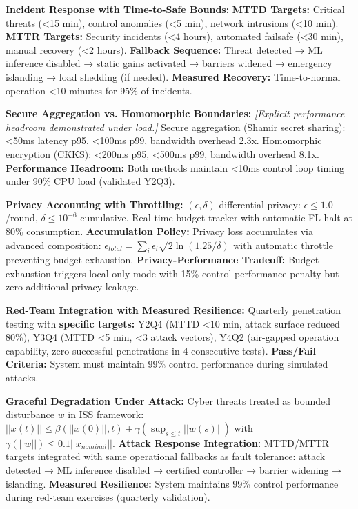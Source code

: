 \documentclass[12pt]{article}
\begin{document}
\textbf{Incident Response with Time-to-Safe Bounds:} \textbf{MTTD Targets:} Critical threats (<15 min), control anomalies (<5 min), network intrusions (<10 min). \textbf{MTTR Targets:} Security incidents (<4 hours), automated failsafe (<30 min), manual recovery (<2 hours). \textbf{Fallback Sequence:} Threat detected → ML inference disabled → static gains activated → barriers widened → emergency islanding → load shedding (if needed). \textbf{Measured Recovery:} Time-to-normal operation <10 minutes for 95\% of incidents.

\textbf{Secure Aggregation vs. Homomorphic Boundaries:} \textit{[Explicit performance headroom demonstrated under load.]} Secure aggregation (Shamir secret sharing): <50ms latency p95, <100ms p99, bandwidth overhead 2.3x. Homomorphic encryption (CKKS): <200ms p95, <500ms p99, bandwidth overhead 8.1x. \textbf{Performance Headroom:} Both methods maintain <10ms control loop timing under 90\% CPU load (validated Y2Q3).

\textbf{Privacy Accounting with Throttling:} $(\epsilon, \delta)$-differential privacy: $\epsilon \leq 1.0$/round, $\delta \leq 10^{-6}$ cumulative. Real-time budget tracker with automatic FL halt at 80\% consumption. \textbf{Accumulation Policy:} Privacy loss accumulates via advanced composition: $\epsilon_{total} = \sum_i \epsilon_i \sqrt{2\ln(1.25/\delta)}$ with automatic throttle preventing budget exhaustion. \textbf{Privacy-Performance Tradeoff:} Budget exhaustion triggers local-only mode with 15\% control performance penalty but zero additional privacy leakage.

\textbf{Red-Team Integration with Measured Resilience:} Quarterly penetration testing with \textbf{specific targets:} Y2Q4 (MTTD <10 min, attack surface reduced 80\%), Y3Q4 (MTTD <5 min, <3 attack vectors), Y4Q2 (air-gapped operation capability, zero successful penetrations in 4 consecutive tests). \textbf{Pass/Fail Criteria:} System must maintain 99\% control performance during simulated attacks.

\textbf{Graceful Degradation Under Attack:} Cyber threats treated as bounded disturbance $w$ in ISS framework: $||x(t)|| \leq \beta(||x(0)||, t) + \gamma(\sup_{s \leq t} ||w(s)||)$ with $\gamma(||w||) \leq 0.1||x_{nominal}||$. \textbf{Attack Response Integration:} MTTD/MTTR targets integrated with same operational fallbacks as fault tolerance: attack detected → ML inference disabled → certified controller → barrier widening → islanding. \textbf{Measured Resilience:} System maintains 99\% control performance during red-team exercises (quarterly validation).
\end{document}

